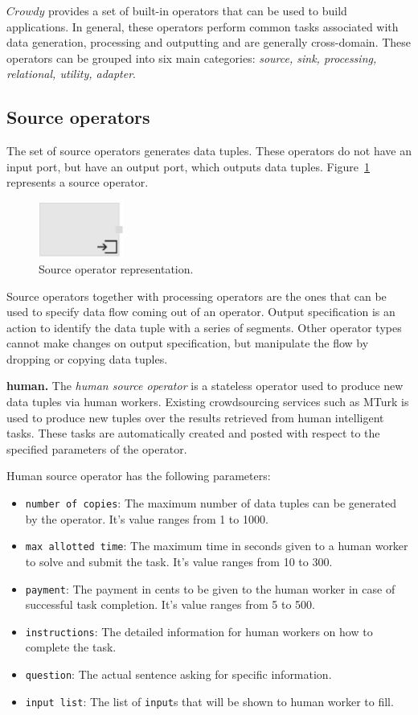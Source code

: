 $Crowdy$ provides a set of built-in operators that can be used to build applications. 
In general, these operators perform common tasks associated with data generation, 
processing and outputting and are generally cross-domain. These operators can be 
grouped into six main categories: \textit{source, sink, processing, relational, utility, adapter}.

\subsection{Source operators}
The set of source operators generates data tuples. These operators do not have 
an input port, but have an output port, which outputs data tuples. Figure~\ref{fig:sourceoperator} 
represents a source operator.

\begin{figure}[ht]
	\centering
	\includegraphics[width=0.25\textwidth]{figures/SourceOperator.pdf}
	\caption{Source operator representation.}
	\label{fig:sourceoperator}
\end{figure}

Source operators together with processing operators are the ones that can be 
used to specify data flow coming out of an operator. Output specification is an 
action to identify the data tuple with a series of segments. Other operator types 
cannot make changes on output specification, but manipulate the flow by dropping 
or copying data tuples.

\textbf{human.} 
The \textit{human source operator} is a stateless operator used to produce new data tuples 
via human workers. Existing crowdsourcing services such as MTurk is used 
to produce new tuples over the results retrieved from human intelligent tasks. These 
tasks are automatically created and posted with respect to the specified parameters 
of the operator.

Human source operator has the following parameters:
\begin{itemize}
	\item \texttt{number of copies}: The maximum number of data tuples can be 
	generated by the operator. It's value ranges from 1 to 1000.
	\item \texttt{max allotted time}: The maximum time in seconds given to a human 
	worker to solve and submit the task. It's value ranges from 10 to 300.
	\item \texttt{payment}: The payment in cents to be given to the human worker in 
	case of successful task completion. It's value ranges from 5 to 500.
	\item \texttt{instructions}: The detailed information for human workers on how to 
	complete the task.
	\item \texttt{question}: The actual sentence asking for specific information.
	\item \texttt{input list}: The list of \texttt{input}s that will be shown to human worker to fill.
\end{itemize}

